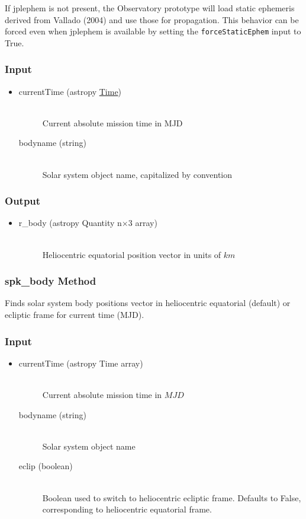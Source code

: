 \documentclass[cleanfoot]{asme2ej}
\begin{document}
If jplephem is not present, the Observatory prototype will load static ephemeris derived from Vallado (2004) and use those for propagation.  This behavior can be forced even when jplephem is available by setting the \verb+forceStaticEphem+ input to True.
\subsubsection*{Input}
\begin{itemize}
\item
\begin{description}
    \item[currentTime (astropy \href{http://astropy.readthedocs.org/en/latest/time/index.html}{Time})] \hfill \\ Current absolute mission time in MJD
    \item[bodyname (string)] \hfill \\ Solar system object name, capitalized by convention
\end{description}
\end{itemize}
\subsubsection*{Output}
\begin{itemize}
\item
\begin{description}
    \item[r\_body (astropy Quantity n$\times$3 array)] \hfill \\ Heliocentric equatorial position vector in units of $ km $
\end{description}
\end{itemize}

\subsubsection{spk\_body Method} \label{sec:spkbody}
Finds solar system body positions vector in heliocentric equatorial (default) or ecliptic frame for current time (MJD).
\subsubsection*{Input}
\begin{itemize}
\item
\begin{description}
    \item[currentTime (astropy Time array)] \hfill \\ Current absolute mission time in $MJD$
    \item[bodyname (string)] \hfill \\ Solar system object name
    \item[eclip (boolean)] \hfill \\Boolean used to switch to heliocentric ecliptic frame. Defaults to False, corresponding to heliocentric equatorial frame.
\end{description}
\end{itemize}
\end{document}
